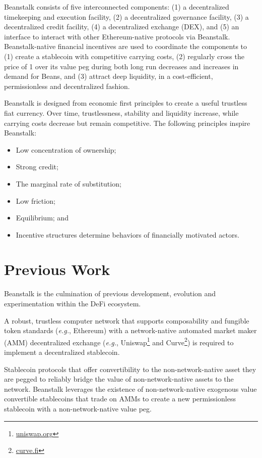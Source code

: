 \documentclass[tikz]{article}
\newcommand{\term}[1]{\textsl{#1}}
\newcommand{\fref}[1]{\footnote{\href{http://#1}{#1}}}
\newcommand{\Bean}{} %
\begin{document}
Beanstalk consists of five interconnected components: (1) a decentralized timekeeping and execution facility, (2) a decentralized governance facility, (3) a decentralized credit facility, (4) a decentralized exchange (DEX), and (5) an interface to interact with other Ethereum-native protocols via Beanstalk. Beanstalk-native financial incentives are used to coordinate the components to (1) create a stablecoin with competitive carrying costs, (2) regularly cross the price of \Bean1 over its value peg during both long run decreases and increases in demand for Beans, and (3) attract deep liquidity, in a cost-efficient, permissionless and decentralized fashion.

Beanstalk is designed from economic first principles to create a useful trustless fiat currency. Over time, trustlessness, stability and liquidity increase, while carrying costs decrease but remain competitive. The following principles inspire Beanstalk:
\begin{itemize}[midsep]
    \item Low concentration of ownership;
    \item Strong credit;
    \item The marginal rate of substitution;
    \item Low friction;
    \item Equilibrium; and
    \item Incentive structures determine behaviors of financially motivated actors.
\end{itemize}

\section{Previous Work}
Beanstalk is the culmination of previous development, evolution and experimentation within the DeFi ecosystem. 

A robust, trustless computer network that supports composability and fungible token standards (\term{e.g.}, Ethereum) with a network-native automated market maker (AMM) decentralized exchange (\term{e.g.}, Uniswap\fref{uniswap.org} and Curve\fref{curve.fi}) is required to implement a decentralized stablecoin. 

Stablecoin protocols that offer convertibility to the non-network-native asset they are pegged to reliably bridge the value of non-network-native assets to the network. Beanstalk leverages the existence of non-network-native exogenous value convertible stablecoins that trade on AMMs to create a new permissionless stablecoin with a non-network-native value peg.
\end{document}
